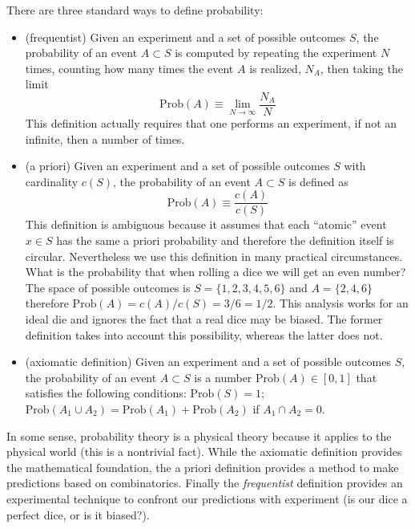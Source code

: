 \documentclass[justified,sixbynine]{tufte-book}
\theoremstyle{plain}%
\theoremstyle{definition}
\theoremstyle{remark}
\begin{document}
\begin{fullwidth}
There are three standard ways to define probability:

\begin{itemize}
\item  (frequentist) Given an experiment and a set of possible outcomes $S$,
the probability of an event $A\subset S$ is computed by repeating the
experiment $N$ times, counting how many times the event $A$ is realized, $N_A
$, then taking the limit
\begin{equation}
\textrm{Prob}(A)\equiv \lim_{N\rightarrow \infty }\frac{N_A}N
\end{equation}
This definition actually requires that one performs an experiment,
if not an infinite, then a number of times.

\item  (a priori) Given an experiment and a set of possible outcomes $S$
with cardinality $c(S)$, the probability of an event $A\subset S$ is defined
as
\begin{equation}
\textrm{Prob}(A)\equiv \frac{c(A)}{c(S)}
\end{equation}
This definition is ambiguous because it assumes that each ``atomic'' event $%
x\in S$ has the same a priori probability and therefore the definition
itself is circular. Nevertheless we use this definition in many practical
circumstances. What is the probability that when rolling a dice we will get an even
number? The space of possible outcomes is $S=\{1,2,3,4,5,6\}$ and $A=\{2,4,6\}
$ therefore $\textrm{Prob}(A)=c(A)/c(S)=3/6=1/2$. This analysis works for an ideal die
and ignores the fact that a real dice may be biased. The former definition
takes into account this possibility, whereas the latter does not.

\item  (axiomatic definition) Given an experiment and a set of possible
outcomes $S$, the probability of an event $A\subset S$ is a number $\textrm{Prob}(A)\in
[0,1]$ that satisfies the following conditions: $\textrm{Prob}(S)=1$; $\textrm{Prob}(A_1\cup
A_2)=\textrm{Prob}(A_1)+\textrm{Prob}(A_2)$ if $A_1\cap A_2=0$.
\end{itemize}

In some sense, probability theory is a physical theory because it applies to
the physical world (this is a nontrivial fact). While the axiomatic
definition provides the mathematical foundation, the a priori
definition provides a method to make predictions based on combinatorics.
Finally the {\em frequentist} definition provides an experimental
technique to confront our predictions with experiment (is our dice a perfect
dice, or is it biased?).


\end{fullwidth}
\end{document}
